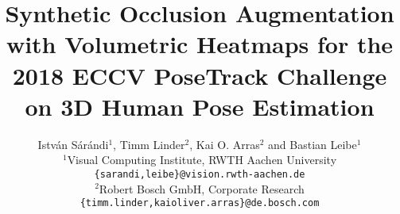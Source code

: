 \documentclass[10pt,twocolumn,letterpaper]{article}
\begin{document}
\newcommand{\partialderiv}[1]{\frac{\partial}{\partial #1}}
\newcommand{\partialfrac}[2]{\frac{\partial #1}{\partial #2}}
\newcommand{\deriv}[1]{\frac{\textnormal{d}}{\textnormal{d} #1}}
\newcommand{\derivfrac}[2]{\frac{\textnormal{d} #1}{\textnormal{d} #2}}
\newcommand{\half}{\nicefrac{1}{2}}
\newcommand{\veclen}[1]{\left\|#1\right\|}
\newcommand{\veccoords}[2]{
    \begin{pmatrix}
      #1 \\
      #2
    \end{pmatrix}
  }
  
\newcommand{\veccoordsthree}[3]{
    \begin{pmatrix}
      #1 \\
      #2 \\
      #3
    \end{pmatrix}
  }
  
\newcommand{\horizveccoords}[2]{
    \begin{pmatrix}
      #1 & #2
    \end{pmatrix}
  }

\newcommand{\floor}[1]{\lfloor #1\rfloor}  
\newcommand{\condprob}[2]{P\big(#1 \big| #2\big)}  
\newcommand{\prob}[1]{P\big(#1\big)}  

\newcommand{\at}[2]{\left.#1\right|_{#2}}
\newcommand{\newln}{\\&\quad\quad{}}
\newcommand{\tr}{^\top}
\newcommand{\inv}{^{-1}}
\newcommand{\reals}{\mathbb{R}}

\newcommand*\SetCond[2]{\left\{#1 \big| #2\right\}}
\newcommand*\Set[1]{\left\{#1\right\}}
\newcommand*\equ[1]{\begin{equation*}#1\end{equation*}}
\newcommand*\abs[1]{\left|#1\right|}
\newcommand*\range[2]{\Set{#1,\ldots,#2}}
\newcommand*\varsupto[2]{#1_1,\ldots,#1_{#2}}
\newcommand*\upto[1]{\in\range{1}{#1}}

 \graphicspath{{images/}}

\title{Synthetic Occlusion Augmentation with Volumetric Heatmaps for the  \\ 2018 ECCV PoseTrack Challenge on 3D Human Pose Estimation}

\author{Istv\'{a}n S\'{a}r\'{a}ndi$^{1}$, Timm Linder$^{2}$, Kai O. Arras$^{2}$ and Bastian Leibe$^{1}$\vspace{8pt}\\
$^{1}$Visual Computing Institute, RWTH Aachen University \\ {\tt\small \{sarandi,leibe\}@vision.rwth-aachen.de} \\
$^{2}$Robert Bosch GmbH, Corporate Research \\ {\tt\small \{timm.linder,kaioliver.arras\}@de.bosch.com}}
\end{document}
